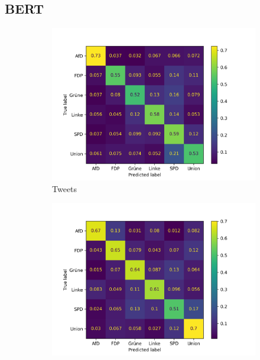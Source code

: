 \subsection*{BERT}

\begin{figure}[H]
    \centering
    \begin{subfigure}{0.49\textwidth}
        \includegraphics[width=\textwidth]{data/images/modeling/bert/none/tweets_confusion_matrix.png}
        \caption{Tweets} \label{sfig:confusionMatrixBertTweetsUnbalanced}
    \end{subfigure}
    \hfill
    \begin{subfigure}{0.49\textwidth}
        \includegraphics[width=\textwidth]{data/images/modeling/bert/none/party_programs_confusion_matrix.png}

\end{subfigure}
\end{figure}
